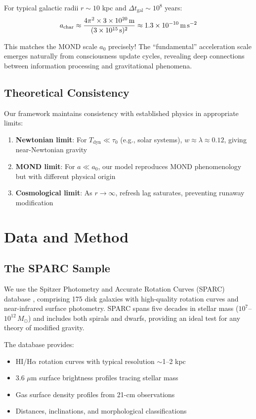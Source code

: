 \documentclass[twocolumn,prd,amsmath,amssymb,aps,superscriptaddress,nofootinbib]{revtex4-2}
\newcommand{\Msun}{M_{\odot}}
\newcommand{\azero}{a_0}
\begin{document}
For typical galactic radii $r \sim 10$ kpc and $\Delta t_{\text{gal}} \sim 10^8$ years:
\begin{equation}
a_{\text{char}} \approx \frac{4\pi^2 \times 3 \times 10^{20}\,\text{m}}{(3 \times 10^{15}\,\text{s})^2} \approx 1.3 \times 10^{-10}\,\text{m\,s}^{-2}
\end{equation}

This matches the MOND scale $\azero$ precisely! The ``fundamental'' acceleration scale emerges naturally from consciousness update cycles, revealing deep connections between information processing and gravitational phenomena.

\subsection{Theoretical Consistency}

Our framework maintains consistency with established physics in appropriate limits:

\begin{enumerate}
\item \textbf{Newtonian limit}: For $T_{\text{dyn}} \ll \tau_0$ (e.g., solar systems), $w \approx \lambda \approx 0.12$, giving near-Newtonian gravity
\item \textbf{MOND limit}: For $a \ll \azero$, our model reproduces MOND phenomenology but with different physical origin
\item \textbf{Cosmological limit}: As $r \rightarrow \infty$, refresh lag saturates, preventing runaway modification
\end{enumerate}

\section{Data and Method}
\label{sec:data}

\subsection{The SPARC Sample}

We use the Spitzer Photometry and Accurate Rotation Curves (SPARC) database \cite{Lelli2016}, comprising 175 disk galaxies with high-quality rotation curves and near-infrared surface photometry. SPARC spans five decades in stellar mass ($10^7$--$10^{12}\,\Msun$) and includes both spirals and dwarfs, providing an ideal test for any theory of modified gravity.

The database provides:
\begin{itemize}
\item HI/H$\alpha$ rotation curves with typical resolution $\sim$1--2 kpc
\item 3.6 $\mu$m surface brightness profiles tracing stellar mass
\item Gas surface density profiles from 21-cm observations
\item Distances, inclinations, and morphological classifications
\end{itemize}
\end{document}
